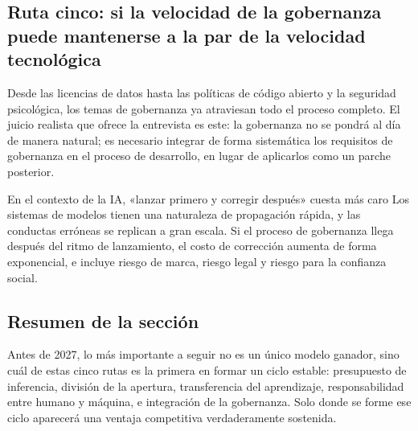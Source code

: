 \subsection{Ruta cinco: si la velocidad de la gobernanza puede mantenerse a la par de la velocidad tecnológica}

Desde las licencias de datos hasta las políticas de código abierto y la seguridad psicológica, los temas de gobernanza ya atraviesan todo el proceso completo. El juicio realista que ofrece la entrevista es este: la gobernanza no se pondrá al día de manera natural; es necesario integrar de forma sistemática los requisitos de gobernanza en el proceso de desarrollo, en lugar de aplicarlos como un parche posterior.

\begin{warningbox}{En el contexto de la IA, «lanzar primero y corregir después» cuesta más caro}
Los sistemas de modelos tienen una naturaleza de propagación rápida, y las conductas erróneas se replican a gran escala. Si el proceso de gobernanza llega después del ritmo de lanzamiento, el costo de corrección aumenta de forma exponencial, e incluye riesgo de marca, riesgo legal y riesgo para la confianza social.
\end{warningbox}

\subsection{Resumen de la sección}

Antes de 2027, lo más importante a seguir no es un único modelo ganador, sino cuál de estas cinco rutas es la primera en formar un ciclo estable: presupuesto de inferencia, división de la apertura, transferencia del aprendizaje, responsabilidad entre humano y máquina, e integración de la gobernanza. Solo donde se forme ese ciclo aparecerá una ventaja competitiva verdaderamente sostenida.


